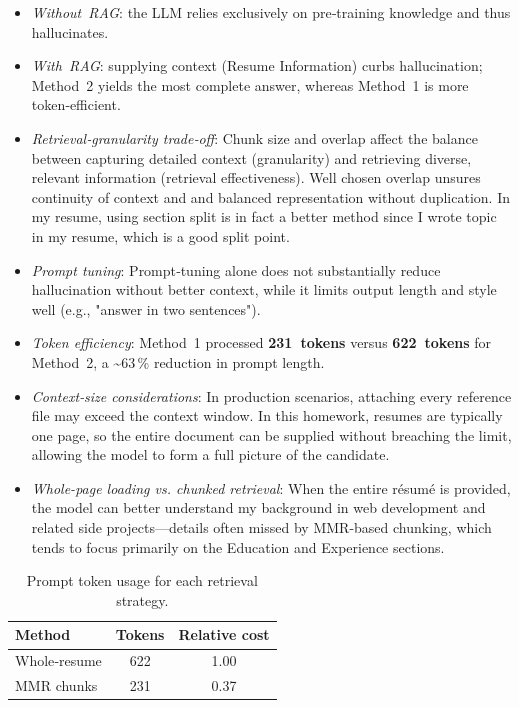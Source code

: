 \documentclass{article}
\begin{document}
\begin{enumerate}[leftmargin=*]
\begin{itemize}[leftmargin=*]
  \item \emph{Without RAG}: the LLM relies exclusively on pre‑training knowledge and thus hallucinates.
  \item \emph{With RAG}: supplying context (Resume Information) curbs hallucination; Method 2 yields the most complete answer, whereas Method 1 is more token‑efficient.
  \item \emph{Retrieval‑granularity trade‑off}: Chunk size and overlap affect the balance between capturing detailed context (granularity) and retrieving diverse, relevant information (retrieval effectiveness). Well chosen overlap unsures continuity of context and and balanced representation without duplication. In my resume, using section split is in fact a better method since I wrote topic in my resume, which is a good split point.
  \item \emph{Prompt tuning}: Prompt‑tuning alone does not substantially reduce hallucination without better context, while it limits output length and style well (e.g., "answer in two sentences").
  \item \emph{Token efficiency}: Method~1 processed \textbf{231 tokens} versus \textbf{622 tokens} for Method~2, a \textasciitilde63\,\% reduction in prompt length.
  \item \emph{Context‑size considerations}: In production scenarios, attaching every reference file may exceed the context window. In this homework, resumes are typically one page, so the entire document can be supplied without breaching the limit, allowing the model to form a full picture of the candidate.
  \item \emph{Whole-page loading vs. chunked retrieval}: When the entire résumé is provided, the model can better understand my background in web development and related side projects—details often missed by MMR-based chunking, which tends to focus primarily on the Education and Experience sections.

\end{itemize}

\begin{table}[hbt]
  \centering
  \caption{Prompt token usage for each retrieval strategy.}
  \label{tab:tokens}
  \begin{tabular}{@{}lcc@{}}
    \toprule
    \textbf{Method} & \textbf{Tokens} & \textbf{Relative cost}\\
    \midrule
    Whole‑resume & 622 & 1.00\\
    MMR chunks & 231 & 0.37\\
    \bottomrule
  \end{tabular}
\end{table}
\FloatBarrier

\end{enumerate}
\end{document}
